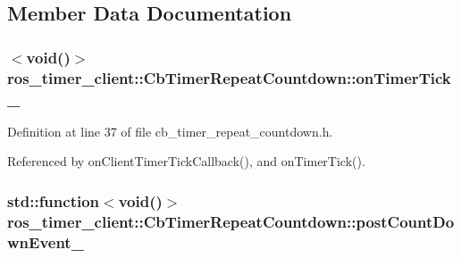 \subsection{Member Data Documentation}
\subsubsection[{\texorpdfstring{on\+Timer\+Tick\+\_\+}{onTimerTick_}}]{$<$void()$>$ ros\+\_\+timer\+\_\+client\+::\+Cb\+Timer\+Repeat\+Countdown\+::on\+Timer\+Tick\+\_\+\hspace{0.3cm}{\ttfamily [private]}}\hypertarget{classros__timer__client_1_1CbTimerRepeatCountdown_a22def81dfff50bf7a7d733e16cf14ce7}{}\label{classros__timer__client_1_1CbTimerRepeatCountdown_a22def81dfff50bf7a7d733e16cf14ce7}


Definition at line 37 of file cb\+\_\+timer\+\_\+repeat\+\_\+countdown.\+h.



Referenced by on\+Client\+Timer\+Tick\+Callback(), and on\+Timer\+Tick().

\subsubsection[{\texorpdfstring{post\+Count\+Down\+Event\+\_\+}{postCountDownEvent_}}]{\setlength{\rightskip}{0pt plus 5cm}std\+::function$<$void()$>$ ros\+\_\+timer\+\_\+client\+::\+Cb\+Timer\+Repeat\+Countdown\+::post\+Count\+Down\+Event\+\_\+\hspace{0.3cm}{\ttfamily [private]}}\hypertarget{classros__timer__client_1_1CbTimerRepeatCountdown_a007a6b8bb86c71b670b56851533a5ea9}{}\label{classros__timer__client_1_1CbTimerRepeatCountdown_a007a6b8bb86c71b670b56851533a5ea9}


